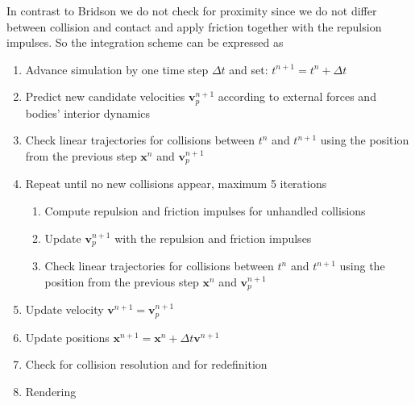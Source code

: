 In contrast to Bridson we do not check for proximity  since we do not differ between collision and contact and apply friction together with the repulsion impulses. So the integration scheme can be expressed as
\begin{enumerate}
\item
Advance simulation by one time step $\Delta t$ and set: $t^{n+1}=t^{n}+\Delta t$
\item
Predict new candidate velocities $\mathbf v^{n+1}_p$ according to external forces and bodies' interior dynamics 
\item Check linear trajectories for collisions between $t^n $ and $t^{n+1}$ using the position from the previous step $\mathbf x^n$ and $\mathbf v^{n+1}_p$
\item Repeat until no new collisions appear, maximum 5 iterations
	\begin{enumerate}[label*=\arabic*.]
	\item Compute repulsion and friction impulses for unhandled collisions
	\item Update $\mathbf v^{n+1}_p$ with the repulsion and friction impulses
	\item Check linear trajectories for collisions between $t^n $ and $t^{n+1}$ using the position from the previous step $\mathbf x^n$ and $\mathbf v^{n+1}_p$
	\end{enumerate}
	
\item Update velocity $\mathbf v^{n+1}=\mathbf v^{n+1}_p$
\item Update positions $\mathbf x^{n+1}=\mathbf x^n+ \Delta t \mathbf v^{n+1}$
\item Check for collision resolution and for redefinition
\item Rendering
\end{enumerate}
